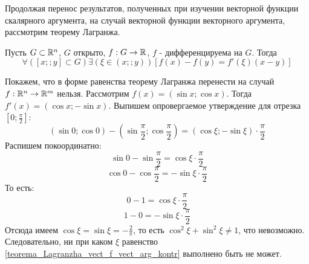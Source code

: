 Продолжая перенос результатов, полученных при изучении векторной функции скалярного аргумента, на случай векторной функции векторного аргумента, рассмотрим теорему Лагранжа.

\begin{teorema}
Пусть $G\subset\mathbb{R}^n$, $G$ открыто, $f:G\to\mathbb{R}$, $f$ - дифференцируема на $G$.
Тогда
\begin{equation}
\forall([x;;y]\subset G)\exists(\xi\in(x;;y))[f(x)-f(y)=f'(\xi)(x-y)]
\end{equation}
\end{teorema}

Покажем, что в форме равенства теорему Лагранжа перенести на случай $f:\mathbb{R}^n\to\mathbb{R}^m$ нельзя.
Рассмотрим $f(x)=(\sin x; \cos x)$. 
Тогда $f'(x)=(\cos x; -\sin x)$.
Выпишем опровергаемое утверждение для отрезка $[0;\frac{\pi}{2}]$:
\begin{equation}\label{teorema_Lagranzha_vect_f_vect_arg_kontr}
(\sin 0; \cos 0)-(\sin \frac{\pi}{2}; \cos \frac{\pi}{2}) = (\cos \xi; -\sin \xi)\cdot\frac{\pi}{2}
\end{equation}
Распишем покоординатно:
$$
\sin 0-\sin \frac{\pi}{2} = \cos \xi \cdot\frac{\pi}{2}
$$
$$
\cos 0-\cos \frac{\pi}{2} = -\sin \xi\cdot\frac{\pi}{2}
$$
То есть:
$$
0-1 = \cos \xi \cdot\frac{\pi}{2}
$$
$$
1-0 = -\sin \xi\cdot\frac{\pi}{2}
$$
Отсюда имеем $\cos \xi = \sin \xi = - \frac{2}{\pi}$, то есть $\cos^2 \xi + \sin^2 \xi \neq 1$, что невозможно.
Следовательно, ни при каком $\xi$ равенство \ref{teorema_Lagranzha_vect_f_vect_arg_kontr} выполнено быть не может.

